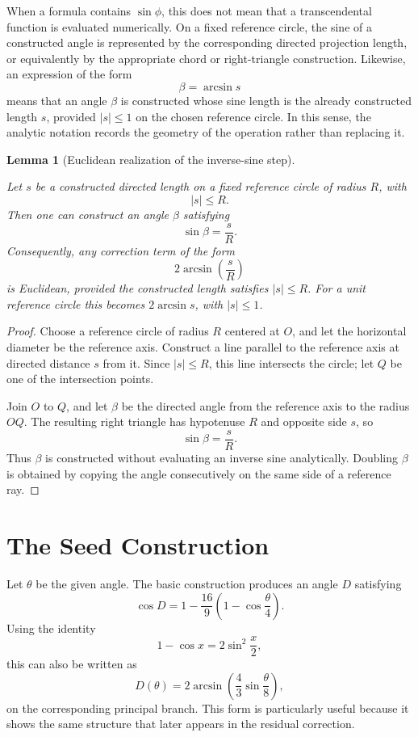 \documentclass[11pt]{article}
\newtheorem{lemma}{Lemma}
\theoremstyle{remark}
\begin{document}
When a formula contains \(\sin \phi\), this does not mean that a transcendental function is evaluated numerically. On a fixed reference circle, the sine of a constructed angle is represented by the corresponding directed projection length, or equivalently by the appropriate chord or right-triangle construction. Likewise, an expression of the form
\[
\beta=\arcsin s
\]
means that an angle \(\beta\) is constructed whose sine length is the already constructed length \(s\), provided \(|s|\le 1\) on the chosen reference circle. In this sense, the analytic notation records the geometry of the operation rather than replacing it.

\begin{lemma}[Euclidean realization of the inverse-sine step]
\label{lem:inverse-sine-euclidean}

Let \(s\) be a constructed directed length on a fixed reference circle of radius \(R\), with
\[
|s|\le R.
\]
Then one can construct an angle \(\beta\) satisfying
\[
\sin\beta=\frac{s}{R}.
\]
Consequently, any correction term of the form
\[
2\arcsin\!\left(\frac{s}{R}\right)
\]
is Euclidean, provided the constructed length satisfies \(|s|\le R\). For a unit reference circle this becomes \(2\arcsin s\), with \(|s|\le 1\).

\end{lemma}

\begin{proof}
Choose a reference circle of radius \(R\) centered at \(O\), and let the horizontal diameter be the reference axis. Construct a line parallel to the reference axis at directed distance \(s\) from it. Since \(|s|\le R\), this line intersects the circle; let \(Q\) be one of the intersection points.

Join \(O\) to \(Q\), and let \(\beta\) be the directed angle from the reference axis to the radius \(OQ\). The resulting right triangle has hypotenuse \(R\) and opposite side \(s\), so
\[
\sin\beta=\frac{s}{R}.
\]
Thus \(\beta\) is constructed without evaluating an inverse sine analytically. Doubling \(\beta\) is obtained by copying the angle consecutively on the same side of a reference ray.
\end{proof}

\section{The Seed Construction}

Let $\theta$ be the given angle.  The basic construction produces an angle $D$ satisfying
\[
\cos D
=
1-\frac{16}{9}\left(1-\cos\frac{\theta}{4}\right).
\]
Using the identity
\[
1-\cos x
=
2\sin^2\frac{x}{2},
\]
this can also be written as
\[
D(\theta)
=
2\arcsin\!\left(
\frac43\sin\frac{\theta}{8}
\right),
\]
on the corresponding principal branch.  This form is particularly useful because it shows
the same structure that later appears in the residual correction.
\end{document}
